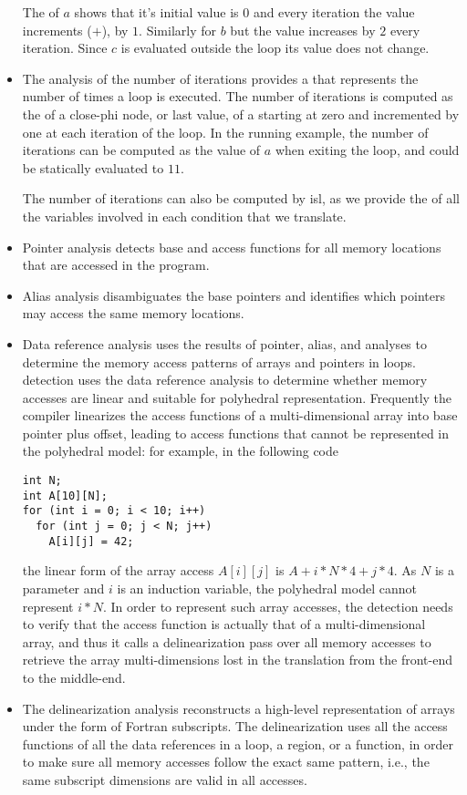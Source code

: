 \documentclass{sig-alternate}
\begin{document}
\begin{itemize}
  The \scev{} of $a$ shows that it's initial value is $0$ and every iteration
  the value increments ($+$), by $1$. Similarly for $b$ but the value increases
  by $2$ every iteration.  Since $c$ is evaluated outside the loop its value
  does not change.

\item The analysis of the number of iterations \cite{scev} provides a \scev{}
  that represents the number of times a loop is executed.  The number of
  iterations is computed as the \scev{} of a close-phi node, or last value, of a
  \scev{} starting at zero and incremented by one at each iteration of the loop.
  In the running example, the number of iterations can be computed as the value
  of $a$ when exiting the loop, and could be statically evaluated to $11$.

  The number of iterations can also be computed by isl, as we provide the
   of all the variables involved in each condition that we translate.

\item Pointer analysis detects base and access functions for all memory
  locations that are accessed in the program.

\item Alias analysis disambiguates the base pointers and identifies which
  pointers may access the same memory locations.

\item Data reference analysis uses the results of pointer, alias, and \scev{}
  analyses to determine the memory access patterns of arrays and pointers in
  loops.  \SCoP{} detection uses the data reference analysis to determine
  whether memory accesses are linear and suitable for polyhedral representation.
  Frequently the compiler linearizes the access functions of a multi-dimensional
  array into base pointer plus offset, leading to access functions that cannot
  be represented in the polyhedral model: for example, in the following code
  \begin{verbatim}
int N;
int A[10][N];
for (int i = 0; i < 10; i++)
  for (int j = 0; j < N; j++)
    A[i][j] = 42;
  \end{verbatim}
  the linear form of the array access $A[i][j]$ is $A + i * N * 4 + j * 4$.  As
  $N$ is a parameter and $i$ is an induction variable, the polyhedral model
  cannot represent $i*N$.  In order to represent such array accesses, the
  \SCoP{} detection needs to verify that the access function is actually that of
  a multi-dimensional array, and thus it calls a delinearization pass over all
  memory accesses to retrieve the array multi-dimensions lost in the translation
  from the front-end to the middle-end.

\item The delinearization analysis \cite{delinearization1, delinearization2}
  reconstructs a high-level representation of arrays under the form of Fortran
  subscripts.  The delinearization uses all the access functions of all the data
  references in a loop, a region, or a function, in order to make sure all
  memory accesses follow the exact same pattern, i.e., the same subscript
  dimensions are valid in all accesses.
\end{itemize}
\end{document}
